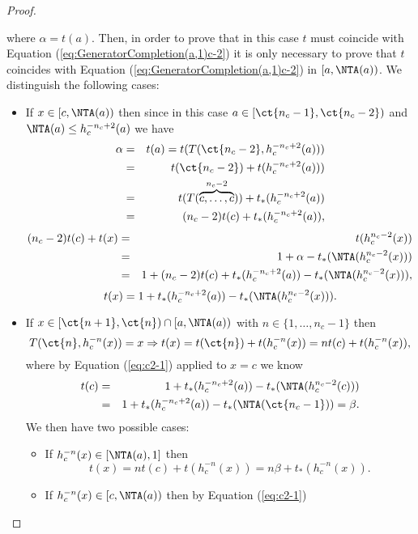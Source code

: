 \begin{proof}
\begin{enumerate}[label=(\roman*)]
\begin{itemize}
$$			$$
			where $\alpha=t(a)$. Then, in order to prove that in this case $t$ must coincide with Equation (\ref{eq:GeneratorCompletion(a,1)c-2}) it is only necessary to prove that $t$ coincides with Equation  (\ref{eq:GeneratorCompletion(a,1)c-2}) in $[a,\NTA(a))$. We distinguish the following cases:
			\begin{itemize}
				\item If $x \in [c,\NTA(a))$ then since in this case $a \in [\ct{n_c-1},\ct{n_c-2})$ and $\NTA(a) \leq h_c^{-n_c+2}(a)$ we have
				\begin{eqnarray} \label{eq:alpha:c2}
					\alpha &=& t(a)=t(T(\ct{n_c-2},h_c^{-n_c+2}(a)))  \nonumber \\
					&=& t(\ct{n_c-2}) + t(h_c^{-n_c+2}(a))) \nonumber \\ 
					&=& t(T(\overbrace{c,\dots,c}^{n_c-2})) + t_*(h_c^{-n_c+2}(a)) \nonumber\\
					&=& (n_c-2)t(c) + t_*(h_c^{-n_c+2}(a)),
				\end{eqnarray}
				\begin{eqnarray*}
					(n_c-2)t(c)+t(x)&=& t(h_c^{n_c-2}(x)) \\
					&=&1+\alpha-t_*(\NTA(h_c^{n_c-2}(x))) \\
					&=& 1 + (n_c-2)t(c) + t_*(h_c^{-n_c+2}(a)) -t_*(\NTA(h_c^{n_c-2}(x))),
				\end{eqnarray*}
				\begin{equation}\label{eq:c2-1}
					t(x) = 1 + t_*(h_c^{-n_c+2}(a)) -t_*(\NTA(h_c^{n_c-2}(x))).
				\end{equation}
				\item If $x \in [\ct{n+1},\ct{n}) \cap [a,\NTA(a))$ with $n \in \{1,\dots,n_c-1\}$ then
				$$T(\ct{n},h_c^{-n}(x))=x \Rightarrow t(x) = t(\ct{n}) + t(h_c^{-n}(x)) = nt(c)+ t(h_c^{-n}(x)),$$
				where by Equation (\ref{eq:c2-1}) applied to $x=c$ we know
				\begin{eqnarray}\label{eq:beta:c2}
					t(c) & =  &1 + t_*(h_c^{-n_c+2}(a)) -t_*(\NTA(h_c^{n_c-2}(c))) \nonumber \\
					& = & 1 + t_*(h_c^{-n_c+2}(a)) -t_*(\NTA(\ct{n_c-1})) = \beta.
				\end{eqnarray}
				We then have two possible cases:
				\begin{itemize}
					\item  If $h_c^{-n}(x) \in [\NTA(a),1]$ then
					$$ t(x) = nt(c)+ t(h_c^{-n}(x)) = n\beta+ t_*(h_c^{-n}(x)).$$
					\item  If $h_c^{-n}(x) \in [c,\NTA(a))$ then by Equation (\ref{eq:c2-1})

\end{itemize}
\end{itemize}
\end{itemize}
\end{enumerate}
\end{proof}
